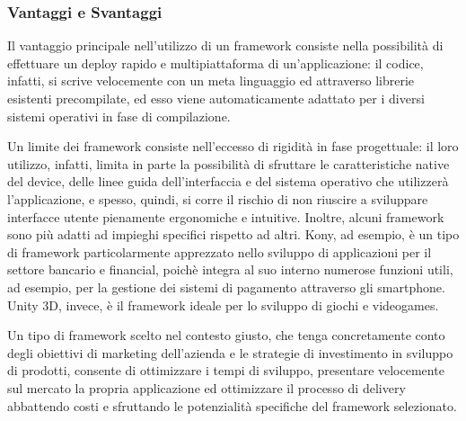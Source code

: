 \subsubsection{Vantaggi e Svantaggi}
Il vantaggio principale nell’utilizzo di un framework consiste nella possibilità di effettuare un deploy rapido e multipiattaforma di un’applicazione: il codice, infatti, si scrive velocemente con un meta linguaggio ed attraverso librerie esistenti precompilate, ed esso viene automaticamente adattato per i diversi sistemi operativi in fase di compilazione.

Un limite dei framework consiste nell’eccesso di rigidità in fase progettuale: il loro utilizzo, infatti, limita in parte la possibilità di sfruttare le caratteristiche native del device, delle linee guida dell’interfaccia e del sistema operativo che utilizzerà l’applicazione, e spesso, quindi, si corre il rischio di non riuscire a sviluppare interfacce utente pienamente ergonomiche e intuitive.
Inoltre, alcuni framework sono più adatti ad impieghi specifici rispetto ad altri. Kony, ad esempio, è un tipo di framework particolarmente apprezzato nello sviluppo di applicazioni per il settore bancario e financial, poichè integra al suo interno numerose funzioni utili, ad esempio, per la gestione dei sistemi di pagamento attraverso gli smartphone. Unity 3D, invece, è il framework ideale per lo sviluppo di giochi e videogames.

Un tipo di framework scelto nel contesto giusto, che tenga concretamente conto degli obiettivi di marketing dell’azienda e le strategie di investimento in sviluppo di prodotti, consente di ottimizzare i tempi di sviluppo, presentare velocemente sul mercato la propria applicazione ed ottimizzare il processo di delivery abbattendo costi e sfruttando le potenzialità specifiche del framework selezionato.

